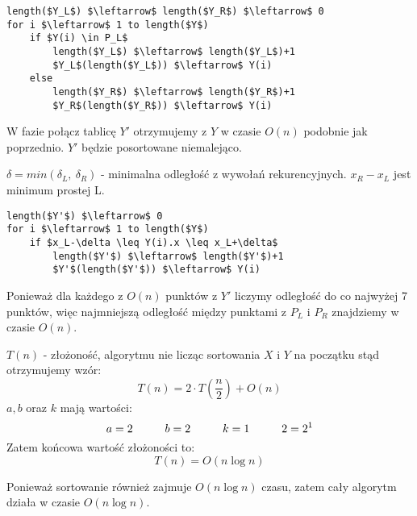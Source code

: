 \begin{lstlisting}
length($Y_L$) $\leftarrow$ length($Y_R$) $\leftarrow$ 0
for i $\leftarrow$ 1 to length($Y$)
	if $Y(i) \in P_L$ 
    	length($Y_L$) $\leftarrow$ length($Y_L$)+1
    	$Y_L$(length($Y_L$)) $\leftarrow$ Y(i)
	else
    	length($Y_R$) $\leftarrow$ length($Y_R$)+1
    	$Y_R$(length($Y_R$)) $\leftarrow$ Y(i)
\end{lstlisting}

W fazie połącz tablicę $Y'$ otrzymujemy z $Y$ w czasie $O(n)$ podobnie jak poprzednio. $Y'$ będzie posortowane niemalejąco. 

$\delta = min(\delta_L,\ \delta_R)$ - minimalna odległość z wywołań rekurencyjnych. $x_R-x_L$ jest minimum prostej L.

\begin{lstlisting}
length($Y'$) $\leftarrow$ 0
for i $\leftarrow$ 1 to length($Y$)
	if $x_L-\delta \leq Y(i).x \leq x_L+\delta$ 
    	length($Y'$) $\leftarrow$ length($Y'$)+1
    	$Y'$(length($Y'$)) $\leftarrow$ Y(i)
\end{lstlisting}

Ponieważ dla każdego z $O(n)$ punktów z $Y'$ liczymy odległość do co najwyżej 7 punktów, więc najmniejszą odległość między punktami z $P_L$ i $P_R$ znajdziemy w czasie $O(n)$.

$T(n)$ - złożoność, algorytmu nie licząc sortowania $X$ i $Y$ na początku stąd otrzymujemy wzór:
$$T(n) = 2 \cdot T(\frac{n}{2})+O(n)$$
$a,b$ oraz $k$ mają wartości:
$$a=2 \hspace*{1cm} b=2 \hspace*{1cm} k=1 \hspace*{1cm} 2=2^1$$
Zatem końcowa wartość złożoności to:
$$T(n) = O(n \log n)$$

Ponieważ sortowanie również zajmuje $O(n \log n)$ czasu, zatem cały algorytm działa w czasie $O(n \log n)$.
